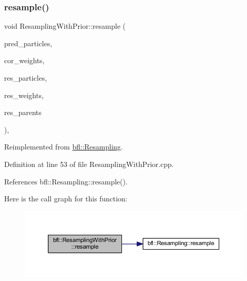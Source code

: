 \subsubsection{\texorpdfstring{resample()}{resample()}}
{\footnotesize\ttfamily void Resampling\+With\+Prior\+::resample (\begin{DoxyParamCaption}\item[{const Eigen\+::\+Ref$<$ const Eigen\+::\+Matrix\+Xf $>$ \&}]{pred\+\_\+particles,  }\item[{const Eigen\+::\+Ref$<$ const Eigen\+::\+Vector\+Xf $>$ \&}]{cor\+\_\+weights,  }\item[{Eigen\+::\+Ref$<$ Eigen\+::\+Matrix\+Xf $>$}]{res\+\_\+particles,  }\item[{Eigen\+::\+Ref$<$ Eigen\+::\+Vector\+Xf $>$}]{res\+\_\+weights,  }\item[{Eigen\+::\+Ref$<$ Eigen\+::\+Vector\+Xf $>$}]{res\+\_\+parents }\end{DoxyParamCaption})\hspace{0.3cm}{\ttfamily [override]}, {\ttfamily [virtual]}}



Reimplemented from \mbox{\hyperlink{classbfl_1_1Resampling_a6b5a246250f1d193b3316c10bdc689f6}{bfl\+::\+Resampling}}.



Definition at line 53 of file Resampling\+With\+Prior.\+cpp.



References bfl\+::\+Resampling\+::resample().

Here is the call graph for this function\+:
\nopagebreak
\begin{figure}[H]
\begin{center}
\leavevmode
\includegraphics[width=350pt]{classbfl_1_1ResamplingWithPrior_a440090305ac024e1f5ad06fd36cccd34_cgraph}
\end{center}
\end{figure}
\mbox{\label{classbfl_1_1ResamplingWithPrior_a9b96b3b950fccbabc6964a0443bc1a1c}} 
